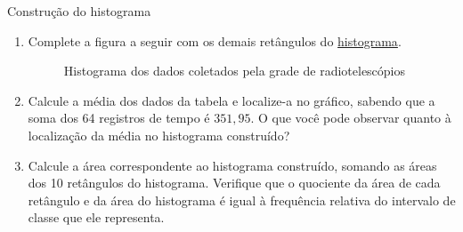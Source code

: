 {\begin{task}{Construção do histograma}
\begin{enumerate}
Para visualizar o comportamento desses dados, iremos construir um gráfico chamado histograma, composto por retângulos adjacentes cujas alturas representam a frequência de observações que ocorrem no intervalo correspondente. A base de cada retângulo corresponde aos limites do intervalo definido no agrupamento dos dados.

\item Complete a figura a seguir com os demais retângulos do \hyperref[est1-fig-10]{histograma}.

\begin{figure}[H]
\centering

\caption{Histograma dos dados coletados pela grade de radiotelescópios}
\label{est1-fig-10}
\end{figure}

\item Calcule a média dos dados da tabela e localize-a no gráfico, sabendo que a soma dos 64 registros de tempo é $351{,}95$. O que você pode observar quanto à localização da média no histograma construído?

\item Calcule a área correspondente ao histograma construído, somando as áreas dos 10 retângulos do histograma. Verifique que o quociente da área de cada retângulo e da área do histograma é igual à frequência relativa do intervalo de classe que ele representa.

\end{enumerate}


\end{task}}
